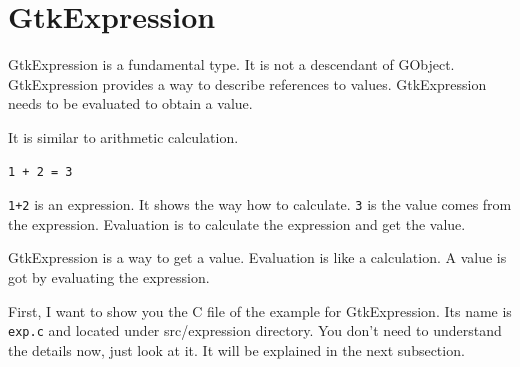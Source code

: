 \hypertarget{gtkexpression}{%
\section{GtkExpression}\label{gtkexpression}}

GtkExpression is a fundamental type. It is not a descendant of GObject.
GtkExpression provides a way to describe references to values.
GtkExpression needs to be evaluated to obtain a value.

It is similar to arithmetic calculation.

\begin{lstlisting}
1 + 2 = 3
\end{lstlisting}

\passthrough{\lstinline!1+2!} is an expression. It shows the way how to
calculate. \passthrough{\lstinline!3!} is the value comes from the
expression. Evaluation is to calculate the expression and get the value.

GtkExpression is a way to get a value. Evaluation is like a calculation.
A value is got by evaluating the expression.

First, I want to show you the C file of the example for GtkExpression.
Its name is \passthrough{\lstinline!exp.c!} and located under
src/expression directory. You don't need to understand the details now,
just look at it. It will be explained in the next subsection.

